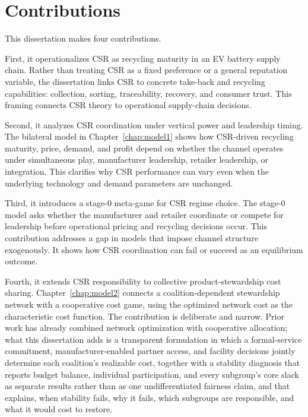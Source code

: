 \section{Contributions}
\label{sec:intro_contributions}

This dissertation makes four contributions.

First, it operationalizes CSR as recycling maturity in an EV battery supply chain. Rather than treating CSR as a fixed preference or a general reputation variable, the dissertation links CSR to concrete take-back and recycling capabilities: collection, sorting, traceability, recovery, and consumer trust. This framing connects CSR theory to operational supply-chain decisions.

Second, it analyzes CSR coordination under vertical power and leadership timing. The bilateral model in Chapter~\ref{chap:model1} shows how CSR-driven recycling maturity, price, demand, and profit depend on whether the channel operates under simultaneous play, manufacturer leadership, retailer leadership, or integration. This clarifies why CSR performance can vary even when the underlying technology and demand parameters are unchanged.

Third, it introduces a stage-0 meta-game for CSR regime choice. The stage-0 model asks whether the manufacturer and retailer coordinate or compete for leadership before operational pricing and recycling decisions occur. This contribution addresses a gap in models that impose channel structure exogenously. It shows how CSR coordination can fail or succeed as an equilibrium outcome.

Fourth, it extends CSR responsibility to collective product-stewardship cost sharing. Chapter~\ref{chap:model2} connects a coalition-dependent stewardship network with a cooperative cost game, using the optimized network cost as the characteristic cost function. The contribution is deliberate and narrow. Prior work has already combined network optimization with cooperative allocation; what this dissertation adds is a transparent formulation in which a formal-service commitment, manufacturer-enabled partner access, and facility decisions jointly determine each coalition's realizable cost, together with a stability diagnosis that reports budget balance, individual participation, and every subgroup's core slack as separate results rather than as one undifferentiated fairness claim, and that explains, when stability fails, why it fails, which subgroups are responsible, and what it would cost to restore.


